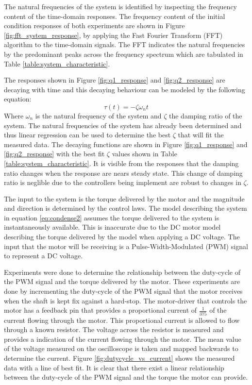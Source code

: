 \documentclass[a4paper,12pt]{article}
\begin{document}
	The natural frequencies of the system is identified by inspecting the frequency content of the time-domain responses. The frequency content of the initial condition responses of both experiments are shown in Figure \ref{fig:fft_system_response}, by applying the Fast Fourier Transform (FFT) algorithm to the time-domain signals. The FFT indicates the natural frequencies by the predominant peaks across the frequency spectrum which are tabulated in Table \ref{table:system_characteristic}.
	
	The responses shown in Figure \ref{fig:q1_response} and \ref{fig:q2_response} are decaying with time and this decaying behaviour can be modeled by the following equation: $$\tau(t) = -\zeta \omega_{n} t$$ Where $\omega_{n}$ is the natural frequency of the system and $\zeta$ the damping ratio of the system. The natural frequencies of the system has already been determined and thus linear regression can be used to determine the best $\zeta$ that will fit the measured data. The decaying functions are shown in Figure \ref{fig:q1_response} and \ref{fig:q2_response} with the best fit $\zeta$ values shown in Table \ref{table:system_characteristic}. It is visible from the responses that the damping ratio changes when the response are nears steady state. This change of damping ratio is neglible due to the controllers being implement are robust to changes in $\zeta$.
	
	The input to the system is the torque delivered by the motor and the magnitude and direction is determined by the control laws. The model describing the system in equation \ref{eq:condense2} assumes the torque delivered to the system is instantaneously available. This is inaccurate due to the DC motor model describing the torque delivered by the model when applying a DC voltage. The input that the motor will be receiving is a Pulse-Width-Modulated (PWM) signal to represent a DC voltage.
	
	Experiments were done to determine the relationship between the duty-cycle of the PWM signal and the torque delivered by the motor. These experiments are done by incrementing the duty-cycle of the PWM signal that the motor receives when the shaft is kept fix against a hard-stop. The motor-driver that controls the motor has a feedback pin that provides a proportional current of $\frac{1}{375}$ of the current flowing through the motor. This proportional current is allowed to flow through a known resistor. The voltage across the resistor is measured and provides a indication of the current flowing through the motor. The mean value of the voltage measured on the oscilloscope is taken and mapped backwards to determine the current. Figure \ref{fig:dutycycle_vs_current} shows the measured data with a line of best fit. It is clear that there exist a linear relationship between the duty-cycle of the PWM signal and the torque the motor can provide.
	
\end{document}
